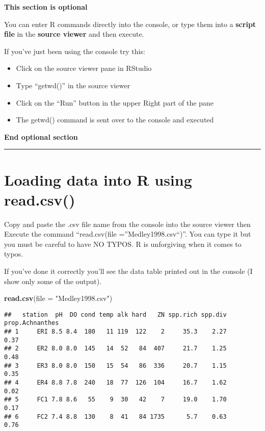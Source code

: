 \documentclass[]{book}
\newenvironment{Shaded}{\begin{snugshade}}{\end{snugshade}}
\newcommand{\KeywordTok}[1]{\textcolor[rgb]{0.13,0.29,0.53}{\textbf{#1}}}
\newcommand{\DataTypeTok}[1]{\textcolor[rgb]{0.13,0.29,0.53}{#1}}
\newcommand{\StringTok}[1]{\textcolor[rgb]{0.31,0.60,0.02}{#1}}
\newcommand{\NormalTok}[1]{#1}
\providecommand{\tightlist}{%
  \setlength{\itemsep}{0pt}\setlength{\parskip}{0pt}}
\theoremstyle{definition}
\theoremstyle{definition}
\theoremstyle{definition}
\theoremstyle{remark}
\begin{document}
\textbf{This section is optional}

You can enter R commands directly into the console, or type them into a
\textbf{script file} in the \textbf{source viewer} and then execute.

If you've just been using the console try this:

\begin{itemize}
\tightlist
\item
  Click on the source viewer pane in RStudio
\item
  Type ``getwd()'' in the source viewer
\item
  Click on the ``Run'' button in the upper Right part of the pane
\item
  The getwd() command is sent over to the console and executed
\end{itemize}

\textbf{End optional section}

\begin{center}\rule{0.5\linewidth}{\linethickness}\end{center}

\section{Loading data into R using
read.csv()}\label{loading-data-into-r-using-read.csv}

Copy and paste the .csv file name from the console into the source
viewer then Execute the command ``read.csv(file =''Medley1998.csv``)''.
You can type it but you must be careful to have NO TYPOS. R is
unforgiving when it comes to typos.

If you've done it correctly you'll see the data table printed out in the
console (I show only some of the output).

\begin{Shaded}
\begin{Highlighting}[]
\KeywordTok{read.csv}\NormalTok{(}\DataTypeTok{file =} \StringTok{"Medley1998.csv"}\NormalTok{)}
\end{Highlighting}
\end{Shaded}

\begin{verbatim}
##   station  pH  DO cond temp alk hard   ZN spp.rich spp.div prop.Achnanthes
## 1     ERI 8.5 8.4  180   11 119  122    2     35.3    2.27            0.37
## 2     ER2 8.0 8.0  145   14  52   84  407     21.7    1.25            0.48
## 3     ER3 8.0 8.0  150   15  54   86  336     20.7    1.15            0.35
## 4     ER4 8.8 7.8  240   18  77  126  104     16.7    1.62            0.02
## 5     FC1 7.8 8.6   55    9  30   42    7     19.0    1.70            0.17
## 6     FC2 7.4 8.8  130    8  41   84 1735      5.7    0.63            0.76
\end{verbatim}
\end{document}
